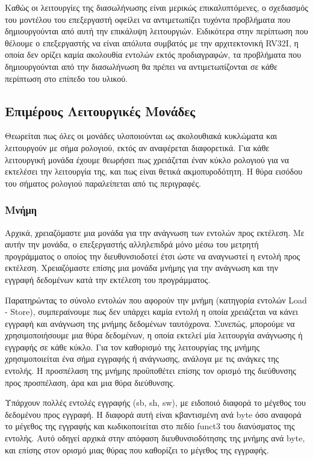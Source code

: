 \documentclass[11pt]{extarticle}
\begin{document}
\newpage

Καθώς οι λειτουργίες της διασωλήνωσης είναι μερικώς επικαλυπτόμενες, ο σχεδιασμός του μοντέλου του επεξεργαστή οφείλει να αντιμετωπίζει τυχόντα προβλήματα που δημιουργούνται από αυτή την επικάλυψη λειτουργιών.
Ειδικότερα στην περίπτωση που θέλουμε ο επεξεργαστής να είναι απόλυτα συμβατός με την αρχιτεκτονική RV32I, η οποία δεν ορίζει καμία ακολουθία εντολών εκτός προδιαγραφών, τα προβλήματα που δημιουργούνται από την διασωλήνωση θα πρέπει να αντιμετωπίζονται σε κάθε περίπτωση στο επίπεδο του υλικού.



\subsection{Επιμέρους Λειτουργικές Μονάδες}
Θεωρείται πως όλες οι μονάδες υλοποιούνται ως ακολουθιακά κυκλώματα και λειτουργούν με σήμα ρολογιού, εκτός αν αναφέρεται διαφορετικά.
Για κάθε λειτουργική μονάδα έχουμε θεωρήσει πως χρειάζεται έναν κύκλο ρολογιού για να εκτελέσει την λειτουργία της, και πως είναι θετικά ακμοπυροδότητη.
Η θύρα εισόδου του σήματος ρολογιού παραλείπεται από τις περιγραφές.

\subsubsection{Μνήμη}
Αρχικά, χρειαζόμαστε μια μονάδα για την ανάγνωση των εντολών προς εκτέλεση.
Με αυτήν την μονάδα, ο επεξεργαστής αλληλεπιδρά μόνο μέσω του μετρητή προγράμματος ο οποίος την διευθυνσιοδοτεί έτσι ώστε να αναγνωστεί η εντολή προς εκτέλεση.
Χρειαζόμαστε επίσης μια μονάδα μνήμης για την ανάγνωση και την εγγραφή δεδομένων κατά την εκτέλεση του προγράμματος.

Παρατηρώντας το σύνολο εντολών που αφορούν την μνήμη (κατηγορία εντολών Load - Store), συμπεραίνουμε πως δεν υπάρχει καμία εντολή η οποία χρειάζεται να κάνει εγγραφή και ανάγνωση της μνήμης δεδομένων ταυτόχρονα.
Συνεπώς, μπορούμε να χρησιμοποιήσουμε μια θύρα δεδομένων, η οποία εκτελεί μία λειτουργία ανάγνωσης ή εγγραφής σε κάθε κύκλο.
Για τον καθορισμό της λειτουργίας της μνήμης χρησιμοποιείται ένα σήμα εγγραφής ή ανάγνωσης, ανάλογα με τις ανάγκες της εντολής.
Η προσπέλαση της μνήμης προϋποθέτει επίσης τον ορισμό της διεύθυνσης προς προσπέλαση, άρα και μια θύρα διεύθυνσης.

Υπάρχουν πολλές εντολές εγγραφής (sb, sh, sw), με ειδοποιό διαφορά το μέγεθος του δεδομένου προς εγγραφή.
Η διαφορά αυτή είναι κβαντισμένη ανά byte όσο αναφορά το μέγεθος της εγγραφής και κωδικοποιείται στο πεδίο funct3 του διανύσματος της εντολής.
Αυτό οδηγεί αρχικά στην απόφαση διευθυνσιοδότησης της μνήμης ανά byte, και επίσης στον ορισμό μιας θύρας που καθορίζει το μέγεθος της εγγραφής.
\end{document}

